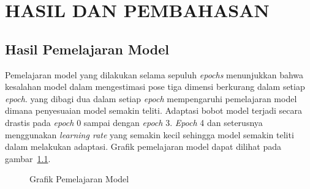 \chapter{HASIL DAN PEMBAHASAN} \label{cha:4-HasilDanPembahasan}

\section{Hasil Pemelajaran Model} \label{sec:4-PersiapanPengujian}

Pemelajaran model yang dilakukan selama sepuluh \textit{epochs} menunjukkan bahwa kesalahan model
dalam mengestimasi pose tiga dimensi berkurang dalam setiap \textit{epoch}. 
yang dibagi dua dalam setiap \textit{epoch} mempengaruhi pemelajaran model dimana penyesuaian model
semakin teliti. Adaptasi bobot model terjadi secara drastis pada \textit{epoch} 0 sampai dengan
\textit{epoch} 3. \textit{Epoch} 4 dan seterusnya menggunakan \textit{learning rate} yang semakin
kecil sehingga model semakin teliti dalam melakukan adaptasi. Grafik pemelajaran model dapat dilihat
pada gambar~\ref{fig:pelatihan}.

\begin{figure}[htbp]
    \begin{center}
    \end{center}
    \vspace{-20pt}
    \captionsetup{labelfont=bf, textfont=bf}
    \caption{Grafik Pemelajaran Model}
    \vspace{-10pt}
    \captionsetup{labelfont=md, textfont=md}
    \label{fig:pelatihan}
\end{figure}

